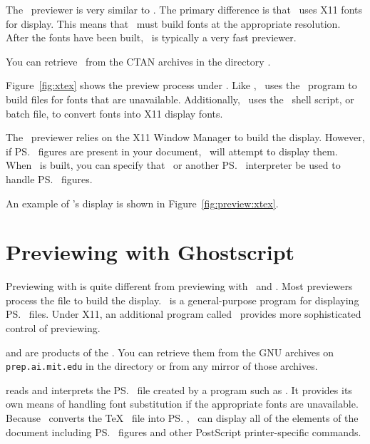 The \xtex\ previewer is
very similar to \xdvi.  The
primary difference is that \xtex\ uses X11 fonts for display.
This means that \xtex\ must build fonts at the appropriate
resolution.  After the fonts have been built, \xtex\ is typically
a very fast previewer.

You can retrieve \xtex\ from the CTAN archives in the
directory .


Figure~\ref{fig:xtex}
shows the preview process under \xtex.  Like \xdvi,
\xtex\ uses the \MakeTeXPK\ program to build  files for fonts
that are unavailable.  Additionally, \xtex\ uses the \TeXtoXfont\ shell
script, or batch file, to convert  fonts into X11 display fonts.

\newpage
The \xtex\ previewer relies on the X11 Window Manager to build
the display.  However, if \ps\ figures are present in your
document, \xtex\ will attempt to display them.  When \xtex\ is
built, you can specify that \ghostscript\ or another \ps\
interpreter be used to handle \ps\ figures.  

An example of \xtex's display is shown in Figure~\ref{fig:preview:xtex}.


\section{Previewing with Ghostscript}
\label{sec:ghostscript}

Previewing with %
 is 
quite different from previewing with \xdvi\ and \xtex.  Most previewers
process the \ext{DVI} file to build the display.  \ghostscript\ is a
general-purpose program for displaying \ps\ files.  Under X11, an additional
program called \ghostview\ provides more sophisticated control of previewing.

\newpage
{} and  are products of the
\idx{Free Software Foundation (FSF)}.  You can retrieve them from the GNU archives on
\verb|prep.ai.mit.edu| in the directory \filename{/pub/gnu} or from any
mirror of those archives.

 reads and interprets the \ps\ file created by a
program such as \dvips.  It provides its own means of handling font
substitution if the appropriate fonts are unavailable.  Because \dvips\
converts the \TeX\  file into \ps, \ghostscript\ can display all
of the elements of the document including \ps\ figures and other PostScript 
printer-specific commands.

